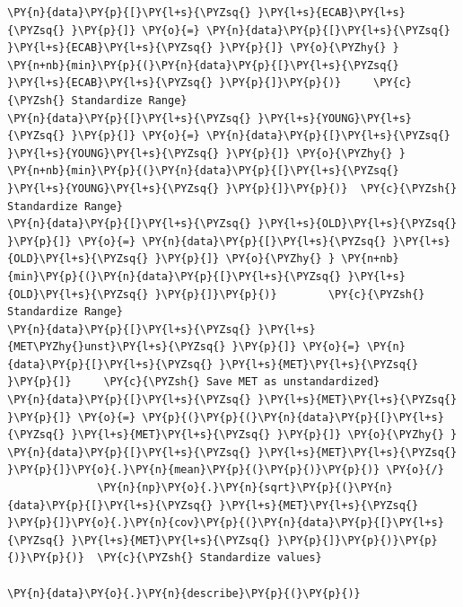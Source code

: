 \documentclass[10pt]{article}\usepackage[]{graphicx}\usepackage[]{xcolor}
\begin{document}
\begin{Verbatim}[commandchars=\\\{\}]
\PY{n}{data}\PY{p}{[}\PY{l+s}{\PYZsq{} }\PY{l+s}{ECAB}\PY{l+s}{\PYZsq{} }\PY{p}{]} \PY{o}{=} \PY{n}{data}\PY{p}{[}\PY{l+s}{\PYZsq{} }\PY{l+s}{ECAB}\PY{l+s}{\PYZsq{} }\PY{p}{]} \PY{o}{\PYZhy{} } \PY{n+nb}{min}\PY{p}{(}\PY{n}{data}\PY{p}{[}\PY{l+s}{\PYZsq{} }\PY{l+s}{ECAB}\PY{l+s}{\PYZsq{} }\PY{p}{]}\PY{p}{)}     \PY{c}{\PYZsh{} Standardize Range}
\PY{n}{data}\PY{p}{[}\PY{l+s}{\PYZsq{} }\PY{l+s}{YOUNG}\PY{l+s}{\PYZsq{} }\PY{p}{]} \PY{o}{=} \PY{n}{data}\PY{p}{[}\PY{l+s}{\PYZsq{} }\PY{l+s}{YOUNG}\PY{l+s}{\PYZsq{} }\PY{p}{]} \PY{o}{\PYZhy{} } \PY{n+nb}{min}\PY{p}{(}\PY{n}{data}\PY{p}{[}\PY{l+s}{\PYZsq{} }\PY{l+s}{YOUNG}\PY{l+s}{\PYZsq{} }\PY{p}{]}\PY{p}{)}  \PY{c}{\PYZsh{} Standardize Range}
\PY{n}{data}\PY{p}{[}\PY{l+s}{\PYZsq{} }\PY{l+s}{OLD}\PY{l+s}{\PYZsq{} }\PY{p}{]} \PY{o}{=} \PY{n}{data}\PY{p}{[}\PY{l+s}{\PYZsq{} }\PY{l+s}{OLD}\PY{l+s}{\PYZsq{} }\PY{p}{]} \PY{o}{\PYZhy{} } \PY{n+nb}{min}\PY{p}{(}\PY{n}{data}\PY{p}{[}\PY{l+s}{\PYZsq{} }\PY{l+s}{OLD}\PY{l+s}{\PYZsq{} }\PY{p}{]}\PY{p}{)}        \PY{c}{\PYZsh{} Standardize Range}
\PY{n}{data}\PY{p}{[}\PY{l+s}{\PYZsq{} }\PY{l+s}{MET\PYZhy{}unst}\PY{l+s}{\PYZsq{} }\PY{p}{]} \PY{o}{=} \PY{n}{data}\PY{p}{[}\PY{l+s}{\PYZsq{} }\PY{l+s}{MET}\PY{l+s}{\PYZsq{} }\PY{p}{]}     \PY{c}{\PYZsh{} Save MET as unstandardized}
\PY{n}{data}\PY{p}{[}\PY{l+s}{\PYZsq{} }\PY{l+s}{MET}\PY{l+s}{\PYZsq{} }\PY{p}{]} \PY{o}{=} \PY{p}{(}\PY{p}{(}\PY{n}{data}\PY{p}{[}\PY{l+s}{\PYZsq{} }\PY{l+s}{MET}\PY{l+s}{\PYZsq{} }\PY{p}{]} \PY{o}{\PYZhy{} } \PY{n}{data}\PY{p}{[}\PY{l+s}{\PYZsq{} }\PY{l+s}{MET}\PY{l+s}{\PYZsq{} }\PY{p}{]}\PY{o}{.}\PY{n}{mean}\PY{p}{(}\PY{p}{)}\PY{p}{)} \PY{o}{/}
              \PY{n}{np}\PY{o}{.}\PY{n}{sqrt}\PY{p}{(}\PY{n}{data}\PY{p}{[}\PY{l+s}{\PYZsq{} }\PY{l+s}{MET}\PY{l+s}{\PYZsq{} }\PY{p}{]}\PY{o}{.}\PY{n}{cov}\PY{p}{(}\PY{n}{data}\PY{p}{[}\PY{l+s}{\PYZsq{} }\PY{l+s}{MET}\PY{l+s}{\PYZsq{} }\PY{p}{]}\PY{p}{)}\PY{p}{)}\PY{p}{)}  \PY{c}{\PYZsh{} Standardize values}

\PY{n}{data}\PY{o}{.}\PY{n}{describe}\PY{p}{(}\PY{p}{)}
\end{Verbatim}
\end{document}
